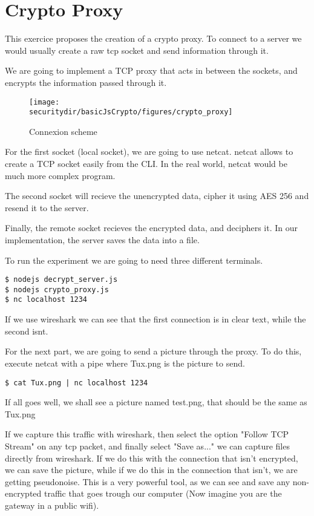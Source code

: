\section{Crypto Proxy}
This exercice proposes the creation of a crypto proxy. To connect to a server we would usually create a raw tcp socket and send information through it. 

We are going to implement a TCP proxy that acts in between the sockets, and encrypts the information passed through it.

\begin{figure}[htb]
	\begin{centering}
		\texttt{[image: \\securitydir/basicJsCrypto/figures/crypto\_proxy]}
		\par\end{centering}
	\caption{\label{fig:crypto_proxy} Connexion scheme}
\end{figure}


For the first socket (local socket), we are going to use netcat. netcat allows to create a TCP socket easily from the CLI. In the real world, netcat would be much more complex program.

The second socket will recieve the unencrypted data, cipher it using AES 256 and resend it to the server.

Finally, the remote socket recieves the encrypted data, and deciphers it. In our implementation, the server saves the data into a file.

To run the experiment we are going to need three different terminals.

\begin{lstlisting}
$ nodejs decrypt_server.js
$ nodejs crypto_proxy.js
$ nc localhost 1234
\end{lstlisting}


If we use wireshark we can see that the first connection is in clear text, while the second isnt.

For the next part, we are going to send a picture through the proxy. To do this, execute netcat with a pipe where Tux.png is the picture to send.

\begin{lstlisting}
$ cat Tux.png | nc localhost 1234
\end{lstlisting}

If all goes well, we shall see a picture named test.png, that should be the same as Tux.png

If we capture this traffic with wireshark, then select the option "Follow TCP Stream" on any tcp packet, and finally select "Save as..." we can capture files directly from wireshark. If we do this with the connection that isn't encrypted, we can save the picture, while if we do this in the connection that isn't, we are getting pseudonoise. This is a very powerful tool, as we can see and save any non-encrypted traffic that goes trough our computer (Now imagine you are the gateway in a public wifi).

